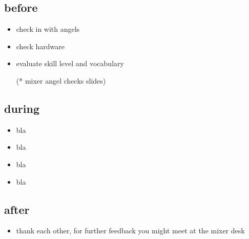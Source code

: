 \documentclass[hyperref={pdfpagelabels=false}]{beamer}
\begin{document}
\subsection{before}
\begin{frame}
\begin{itemize}[<+->]
\item check in with angels %
\item check hardware %
\item evaluate skill level and vocabulary %
\item [(* ] mixer angel checks slides) %
\end{itemize} 
\end{frame}

\begin{frame}
\subsection{during}
\begin{itemize}
\item  bla 
\item  bla 
\item  bla 
\item  bla
\end{itemize} 
\end{frame}

\begin{frame}
\subsection{after}
\begin{itemize}
\item thank each other, for further feedback you might meet at the mixer desk
\end{itemize} 
\end{frame}
\end{document}
